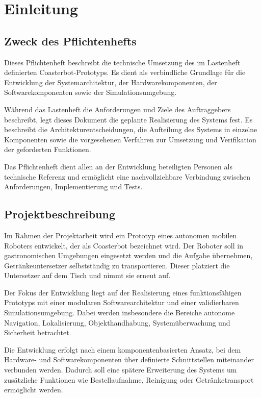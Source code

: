 \documentclass[
  a4paper,
  12pt,
  DIV=12,        %
  parskip=half,  %
  headings=small %
]{scrartcl}
\theoremstyle{definition}
\theoremstyle{definition}
\begin{document}
\newpage

\tableofcontents

\newpage

\section{Einleitung}\label{einleitung}

\subsection{Zweck des Pflichtenhefts}\label{zweck-des-pflichtenhefts}

Dieses Pflichtenheft beschreibt die technische Umsetzung des im
Lastenheft definierten Coasterbot-Prototyps. Es dient als verbindliche
Grundlage für die Entwicklung der Systemarchitektur, der
Hardwarekomponenten, der Softwarekomponenten sowie der
Simulationsumgebung.

Während das Lastenheft die Anforderungen und Ziele des Auftraggebers
beschreibt, legt dieses Dokument die geplante Realisierung des Systems
fest. Es beschreibt die Architekturentscheidungen, die Aufteilung des
Systems in einzelne Komponenten sowie die vorgesehenen Verfahren zur
Umsetzung und Verifikation der geforderten Funktionen.

Das Pflichtenheft dient allen an der Entwicklung beteiligten Personen
als technische Referenz und ermöglicht eine nachvollziehbare Verbindung
zwischen Anforderungen, Implementierung und Tests.

\subsection{Projektbeschreibung}\label{projektbeschreibung}

Im Rahmen der Projektarbeit wird ein Prototyp eines autonomen mobilen
Roboters entwickelt, der als Coasterbot bezeichnet wird. Der Roboter
soll in gastronomischen Umgebungen eingesetzt werden und die Aufgabe
übernehmen, Getränkeuntersetzer selbstständig zu transportieren. Dieser
platziert die Untersetzer auf dem Tisch und nimmt sie erneut auf.

Der Fokus der Entwicklung liegt auf der Realisierung eines
funktionsfähigen Prototyps mit einer modularen Softwarearchitektur und
einer validierbaren Simulationsumgebung. Dabei werden insbesondere die
Bereiche autonome Navigation, Lokalisierung, Objekthandhabung,
Systemüberwachung und Sicherheit betrachtet.

Die Entwicklung erfolgt nach einem komponentenbasierten Ansatz, bei dem
Hardware- und Softwarekomponenten über definierte Schnittstellen
miteinander verbunden werden. Dadurch soll eine spätere Erweiterung des
Systems um zusätzliche Funktionen wie Bestellaufnahme, Reinigung oder
Getränketransport ermöglicht werden.
\end{document}
